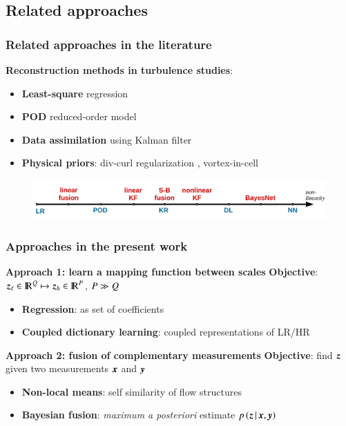 \documentclass{beamer}
\let\olditem\item
\renewcommand{\item}{\setlength{\itemsep}{\fill}\olditem}
\begin{document}
\subsection[Related approaches]{Related approaches}
\begin{frame}
\frametitle{Related approaches in the literature}
	\begin{block}{\textbf{Reconstruction methods in turbulence studies}:}
		\begin{itemize}
			\item \textbf{Least-square} regression {\footnotesize \cite{durgesh2010multi}}
			\item \textbf{POD} reduced-order model {\footnotesize \cite{bonnet1994stochastic}}
			\item \textbf{Data assimilation} using Kalman filter {\footnotesize \cite{papadakis2010data,tu2013integration}}
			\item \textbf{Physical priors}: div-curl regularization {\footnotesize\cite{corpetti2002dense}}, vortex-in-cell {\footnotesize \cite{schneiders2014time}}
		\end{itemize}
	\end{block}
	\vfill
	\pause
	\begin{figure}
		\includegraphics[width=\textwidth]{./figures/turbulence/models_spectrum.pdf}
	\end{figure}	
			
\end{frame}

\begin{frame}
\frametitle{Approaches in the present work}	
	\begin{block}{\textbf{Approach 1: learn a mapping function between scales}}
	\textbf{Objective}: $ \operatorname{\boldsymbol{z}}_\ell \in {\rm I\!R}^Q \mapsto  \operatorname{\boldsymbol{z}}_h \in {\rm I\!R}^P $, $ P \gg Q$ 
		\begin{itemize}
			\item \textbf{\color{red} Regression}: as set of coefficients\\
			\item \textbf{\color{red} Coupled dictionary learning}: coupled representations of LR/HR\\
		\end{itemize}
	\end{block}
	\vfill
	\begin{block}{\textbf{Approach 2: fusion of complementary measurements}}
	\textbf{Objective}: find $ \operatorname{\boldsymbol{z}}$ given two measurements $ \operatorname{\boldsymbol{x}}$ and $ \operatorname{\boldsymbol{y}}$
		\begin{itemize}
			\item \textbf{\color{red} Non-local means}: self similarity of flow structures\\
			\item \textbf{\color{red} Bayesian fusion}: \textit{maximum a posteriori} estimate $p \left(\operatorname{\boldsymbol{z}}|\operatorname{\boldsymbol{x}},\operatorname{\boldsymbol{y}}\right)$	
		\end{itemize}
	\end{block}	
\end{frame}
\end{document}
